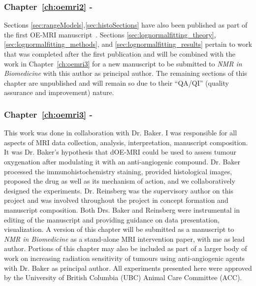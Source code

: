 \subsubsection{Chapter~\ref{ch:oemri2} - }
Sections \ref{sec:rangeModels},\ref{sec:histoSections} have also been published as part of the first OE-MRI manuscript~\cite{Moosvi:2018ca}.
Sections \ref{sec:lognormalfitting_theory}, \ref{sec:lognormalfitting_methods}, and \ref{sec:lognormalfitting_results} pertain to work that was completed after the first publication and will be combined with the work in Chapter~\ref{ch:oemri3} for a new manuscript to be submitted to \textit{NMR in Biomedicine} with this author as principal author.
The remaining sections of this chapter are unpublished and will remain so due to their ``QA/QI'' (quality assurance and improvement) nature.

\subsubsection{Chapter~\ref{ch:oemri3} - }

This work was done in collaboration with Dr. Baker.
I was responsible for all aspects of MRI data collection, analysis, interpretation, manuscript composition. 
It was Dr. Baker's hypothesis that dOE-MRI could be used to assess tumour oxygenation after modulating it with an anti-angiogenic compound. 
Dr. Baker processed the immunohistochemistry staining, provided histological images, proposed the drug as well as its mechanism of action, and we collaboratively designed the experiments. 
Dr. Reinsberg was the supervisory author on this project and was involved throughout the project in concept formation and manuscript composition. 
Both Drs. Baker and Reinsberg were instrumental in editing of the manuscript and providing guidance on data presentation, visualization.
A version of this chapter will be submitted as a manuscript to \textit{NMR in Biomedicine} as a stand-alone MRI intervention paper, with me as lead author.
Portions of this chapter may also be included as part of a larger body of work on increasing radiation sensitivity of tumours using anti-angiogenic agents with Dr. Baker as principal author.
All experiments presented here were approved by the University of British Columbia (UBC) Animal Care Committee (ACC).